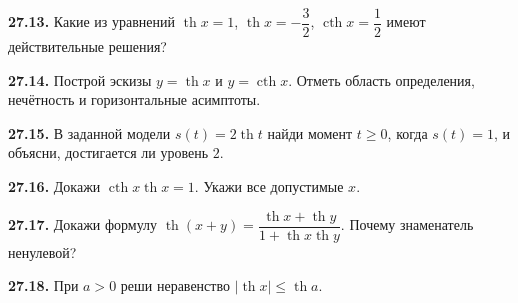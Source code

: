 \noindent\begin{minipage}[t]{\linewidth}\textbf{27.13.} Какие из уравнений \(\operatorname{th}x=1\), \(\operatorname{th}x=-\dfrac32\), \(\operatorname{cth}x=\dfrac12\) имеют действительные решения?\par\end{minipage}\par
\noindent\begin{minipage}[t]{\linewidth}\textbf{27.14.} Построй эскизы \(y=\operatorname{th}x\) и \(y=\operatorname{cth}x\). Отметь область определения, нечётность и горизонтальные асимптоты.\par\end{minipage}\par
\noindent\begin{minipage}[t]{\linewidth}\textbf{27.15.} В заданной модели \(s(t)=2\operatorname{th}t\) найди момент \(t\ge0\), когда \(s(t)=1\), и объясни, достигается ли уровень \(2\).\par\end{minipage}\par
\noindent\begin{minipage}[t]{\linewidth}\textbf{27.16.} Докажи \(\operatorname{cth}x\operatorname{th}x=1\). Укажи все допустимые \(x\).\par\end{minipage}\par
\noindent\begin{minipage}[t]{\linewidth}\textbf{27.17.}\starmark{} Докажи формулу \(\operatorname{th}(x+y)=\dfrac{\operatorname{th}x+\operatorname{th}y}{1+\operatorname{th}x\operatorname{th}y}\). Почему знаменатель ненулевой?\par\end{minipage}\par
\noindent\begin{minipage}[t]{\linewidth}\textbf{27.18.}\starmark{} При \(a>0\) реши неравенство \(|\operatorname{th}x|\le\operatorname{th}a\).\par\end{minipage}\par
\endgroup
